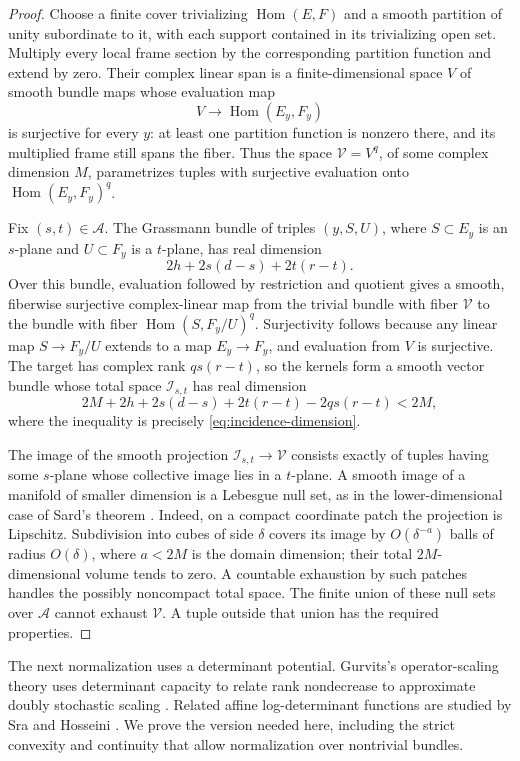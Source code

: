 \begin{proof}
Choose a finite cover trivializing $\operatorname{Hom}(E,F)$ and a smooth
partition of unity subordinate to it, with each support contained in its
trivializing open set.  Multiply every local frame section by the
corresponding partition function and extend by zero.  Their complex
linear span is a finite-dimensional space $V$ of smooth bundle maps
whose evaluation map
\[
  V\longrightarrow\operatorname{Hom}(E_y,F_y)
\]
is surjective for every $y$: at least one partition function is nonzero
there, and its multiplied frame still spans the fiber.  Thus the space
$\mathcal V=V^q$, of some complex dimension $M$, parametrizes tuples with
surjective evaluation onto $\operatorname{Hom}(E_y,F_y)^q$.

Fix $(s,t)\in\mathcal A$.  The Grassmann bundle of triples $(y,S,U)$,
where $S\subset E_y$ is an $s$-plane and $U\subset F_y$ is a $t$-plane,
has real dimension
\[
  2h+2s(d-s)+2t(r-t).
\]
Over this bundle, evaluation followed by restriction and quotient gives
a smooth, fiberwise surjective complex-linear map from the trivial
bundle with fiber $\mathcal V$ to the bundle with fiber
$\operatorname{Hom}(S,F_y/U)^q$.  Surjectivity follows because any linear
map $S\to F_y/U$ extends to a map $E_y\to F_y$, and evaluation from $V$
is surjective.  The target has complex rank $qs(r-t)$, so the kernels
form a smooth vector bundle whose total space $\mathcal I_{s,t}$ has real
dimension
\[
  2M+2h+2s(d-s)+2t(r-t)-2qs(r-t)<2M,
\]
where the inequality is precisely \eqref{eq:incidence-dimension}.

The image of the smooth projection
$\mathcal I_{s,t}\to\mathcal V$ consists exactly of tuples having some
$s$-plane whose collective image lies in a $t$-plane.  A smooth image of a manifold of smaller dimension is a Lebesgue
null set, as in the lower-dimensional case of Sard's theorem
\cite{Sard}.  Indeed, on a compact coordinate patch the projection is
Lipschitz.  Subdivision into cubes of side $\delta$ covers its image
by $O(\delta^{-a})$ balls of radius $O(\delta)$, where $a<2M$ is
the domain dimension; their total $2M$-dimensional volume tends to
zero.  A countable exhaustion by such patches handles the possibly
noncompact total space.  The finite
union of these null sets over $\mathcal A$ cannot exhaust $\mathcal V$.
A tuple outside that union has the required properties.
\end{proof}

The next normalization uses a determinant potential. Gurvits's
operator-scaling theory uses determinant capacity to relate rank
nondecrease to approximate doubly stochastic scaling \cite[Section~4]{Gurvits2003}.
Related affine log-determinant functions are studied by Sra and
Hosseini \cite[Corollary~2.11]{SraHosseini2015}. We prove the version
needed here, including the strict convexity and continuity that allow
normalization over nontrivial bundles.

